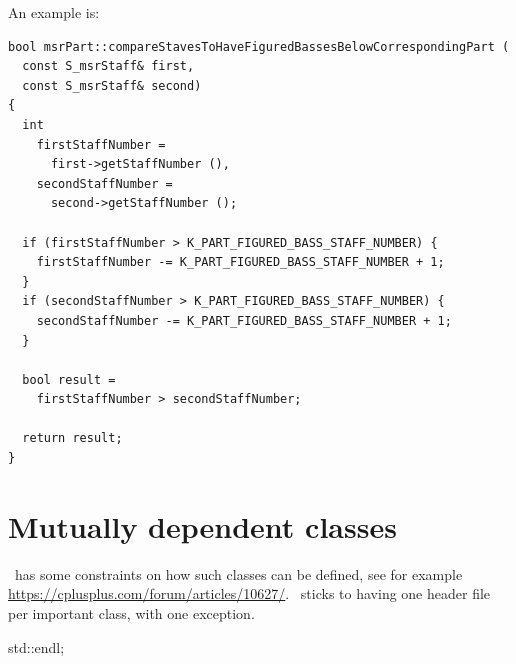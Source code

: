 An example is:
\begin{lstlisting}[language=Terminal]
bool msrPart::compareStavesToHaveFiguredBassesBelowCorrespondingPart (
  const S_msrStaff& first,
  const S_msrStaff& second)
{
  int
    firstStaffNumber =
      first->getStaffNumber (),
    secondStaffNumber =
      second->getStaffNumber ();

  if (firstStaffNumber > K_PART_FIGURED_BASS_STAFF_NUMBER) {
    firstStaffNumber -= K_PART_FIGURED_BASS_STAFF_NUMBER + 1;
  }
  if (secondStaffNumber > K_PART_FIGURED_BASS_STAFF_NUMBER) {
    secondStaffNumber -= K_PART_FIGURED_BASS_STAFF_NUMBER + 1;
  }

  bool result =
    firstStaffNumber > secondStaffNumber;

  return result;
}
\end{lstlisting}


\section{Mutually dependent classes}

\CPlusplus\ has some constraints on how such classes can be defined, see for example \url{https://cplusplus.com/forum/articles/10627/}. \mf\ sticks to having one header file per important class, with one exception.


      std::endl;

%
%


